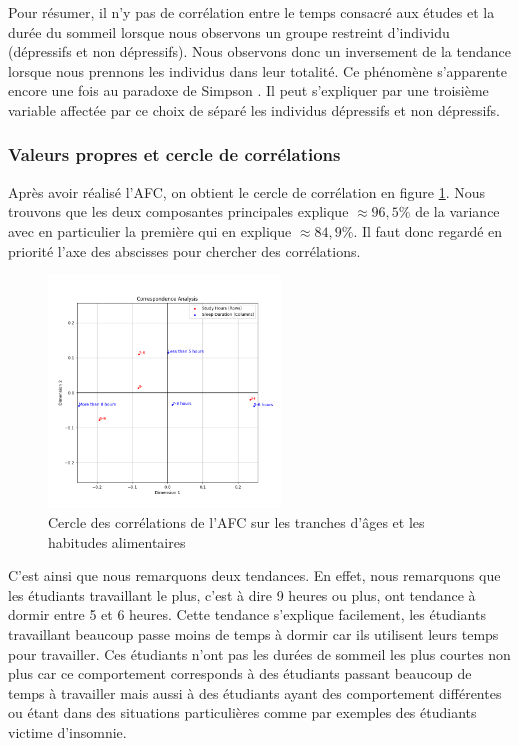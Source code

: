 Pour résumer, il n'y pas de corrélation entre le temps consacré aux études et la durée du sommeil lorsque nous observons un groupe restreint d'individu (dépressifs et non dépressifs).
Nous observons donc un inversement de la tendance lorsque nous prennons les individus dans leur totalité.
Ce phénomène s'apparente encore une fois au paradoxe de Simpson \citep{simpson}. Il peut s'expliquer par une troisième variable affectée par ce choix de séparé les individus dépressifs et non dépressifs.

\subsubsection{Valeurs propres et cercle de corrélations}
 
Après avoir réalisé l'AFC, on obtient le cercle de corrélation en figure \ref{fig:corrStudySleep}. 
Nous trouvons que les deux composantes principales explique $\approx96,5\%$ de la variance avec en particulier la première qui en explique $\approx84,9\%$.
Il faut donc regardé en priorité l'axe des abscisses pour chercher des corrélations.


\begin{figure}[H]
    \begin{center}
      \includegraphics[width=0.55\textwidth,height=0.325\textheight,keepaspectratio]{Images/Study_Sleep_all/Corr_circle.png}
    \end{center}
    \caption{Cercle des corrélations de l'AFC sur les tranches d'âges et les habitudes alimentaires}
    \label{fig:corrStudySleep}
\end{figure}

C'est ainsi que nous remarquons deux tendances. 
En effet, nous remarquons que les étudiants travaillant le plus, c'est à dire 9 heures ou plus, ont tendance à dormir entre 5 et 6 heures. 
Cette tendance s'explique facilement, les étudiants travaillant beaucoup passe moins de temps à dormir car ils utilisent leurs temps pour travailler.
Ces étudiants n'ont pas les durées de sommeil les plus courtes non plus car ce comportement corresponds à des étudiants passant beaucoup de temps à travailler mais aussi à des étudiants ayant des comportement différentes ou étant dans des situations particulières comme par exemples des étudiants victime d'insomnie.


